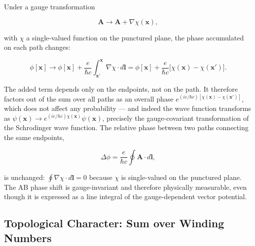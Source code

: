 Under a gauge transformation
\begin{linenomath}
\begin{equation}
\bm A \to \bm A + \nabla\chi(\bm x),
\end{equation}
\end{linenomath}
with $\chi$ a single-valued function on the punctured plane, the phase accumulated on each path changes:
\begin{linenomath}
\begin{equation}
\phi[\bm x] \to \phi[\bm x] + \frac{e}{\hbar c}\int_{\bm x'}^{\bm x} \nabla\chi\cdot d\bm l = \phi[\bm x] + \frac{e}{\hbar c}\bigl[\chi(\bm x) - \chi(\bm x')\bigr].
\end{equation}
\end{linenomath}
The added term depends only on the endpoints, not on the path. It therefore factors out of the sum over all paths as an overall phase $e^{(ie/\hbar c)[\chi(\bm x)-\chi(\bm x')]}$, which does not affect any probability --- and indeed the wave function transforms as $\psi(\bm x) \to e^{(ie/\hbar c)\chi(\bm x)}\psi(\bm x)$, precisely the gauge-covariant transformation of the Schrodinger wave function. The relative phase between two paths connecting the same endpoints,
\begin{linenomath}
\begin{equation}
\Delta\phi = \frac{e}{\hbar c}\oint \bm A\cdot d\bm l,
\end{equation}
\end{linenomath}
is unchanged: $\oint \nabla\chi\cdot d\bm l = 0$ because $\chi$ is single-valued on the punctured plane. The AB phase shift is gauge-invariant and therefore physically measurable, even though it is expressed as a line integral of the gauge-dependent vector potential.

\subsection{Topological Character: Sum over Winding Numbers}

